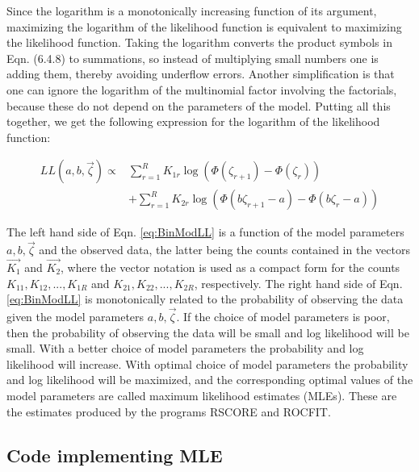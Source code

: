 \documentclass[
]{book}
\begin{document}
Since the logarithm is a monotonically increasing function of its argument, maximizing the logarithm of the likelihood function is equivalent to maximizing the likelihood function. Taking the logarithm converts the product symbols in Eqn. (6.4.8) to summations, so instead of multiplying small numbers one is adding them, thereby avoiding underflow errors. Another simplification is that one can ignore the logarithm of the multinomial factor involving the factorials, because these do not depend on the parameters of the model. Putting all this together, we get the following expression for the logarithm of the likelihood function:

\begin{equation} 
\begin{split}
LL\left ( a,b,\overrightarrow{\zeta} \right ) \propto& \sum_{r=1}^{R} K_{1r}\log \left ( \Phi\left ( \zeta_{r+1} \right ) - \Phi\left ( \zeta_r \right ) \right ) \\
&+ \sum_{r=1}^{R} K_{2r}\log \left ( \Phi\left (b \zeta_{r+1} - a \right ) - \Phi\left ( b \zeta_r - a \right ) \right ) 
\end{split}
\label{eq:BinModLL}
\end{equation}

The left hand side of Eqn. \eqref{eq:BinModLL} is a function of the model parameters \(a,b,\overrightarrow{\zeta}\) and the observed data, the latter being the counts contained in the vectors \(\overrightarrow{K_1}\) and \(\overrightarrow{K_2}\), where the vector notation is used as a compact form for the counts \(K_{11},K_{12},...,K_{1R}\) and \(K_{21},K_{22},...,K_{2R}\), respectively. The right hand side of Eqn. \eqref{eq:BinModLL} is monotonically related to the probability of observing the data given the model parameters \(a,b,\overrightarrow{\zeta}\). If the choice of model parameters is poor, then the probability of observing the data will be small and log likelihood will be small. With a better choice of model parameters the probability and log likelihood will increase. With optimal choice of model parameters the probability and log likelihood will be maximized, and the corresponding optimal values of the model parameters are called maximum likelihood estimates (MLEs). These are the estimates produced by the programs RSCORE and ROCFIT.

\hypertarget{code-implementing-mle}{%
\subsection{Code implementing MLE}\label{code-implementing-mle}}
\end{document}
